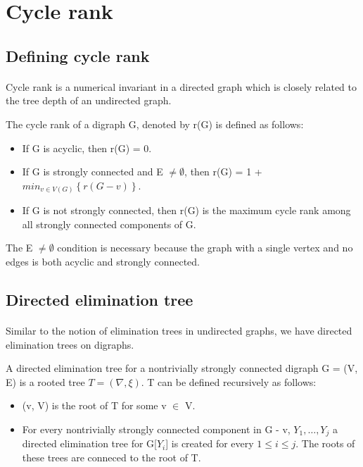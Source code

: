 \section{Cycle rank}

\subsection{Defining cycle rank}

\paragraph{}
Cycle rank is a numerical invariant in a directed graph which is closely related to the tree depth of an undirected graph.
\begin{definition}
The cycle rank of a digraph G, denoted by r(G) is defined as follows:

\begin{itemize}
\item If G is acyclic, then r(G) = 0.
\item If G is strongly connected and E $\neq \emptyset$, then r(G) = 1 + $min_{v \in V(G)} \left\{r(G-v)\right\}$.
\item If G is not strongly connected, then r(G) is the maximum cycle rank among all strongly connected components of G.
\end{itemize}

The E $\neq \emptyset$ condition is necessary because the graph with a single vertex and no edges is both acyclic and strongly connected.

\end{definition}

\subsection{Directed elimination tree}

\paragraph{}
Similar to the notion of elimination trees in undirected graphs, we have directed elimination trees on digraphs.

\begin{definition}

A directed elimination tree for a nontrivially strongly connected digraph G = (V, E) is a rooted tree $T = (\nabla, \xi)$. T can be defined recursively as follows:

\begin{itemize}
\item (v, V) is the root of T for some v $\in$ V.
\item For every nontrivially strongly connected component in G - v, $Y_1, \ldots, Y_j$ a directed elimination tree for G[$Y_i$] is created for every $1 \leq i \leq j$. The roots of these trees are conneced to the root of T.
\end{itemize}

\end{definition}

